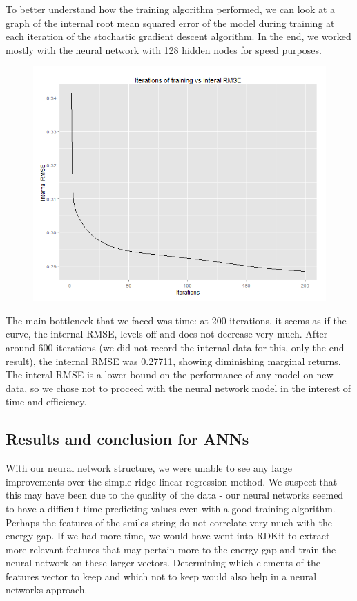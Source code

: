 \documentclass{article}
\begin{document}
To better understand how the training algorithm performed,
we can look at a graph of the internal root mean squared error
of the model during training at each iteration of the stochastic
gradient descent algorithm.  In the end, we worked mostly with
the neural network with 128 hidden nodes for speed purposes.

\begin{figure}
  \begin{center}
    \includegraphics[scale=0.4]{run128.png}
  \end{center}
\end{figure}

The main bottleneck that we faced was time: at 200 iterations, it seems
as if the curve, the internal RMSE, levels off and does not
decrease very much.  After around 600 iterations (we did not
record the internal data for this, only the end result),
the internal RMSE was 0.27711, showing diminishing marginal
returns.  The interal RMSE is a lower
bound on the performance of any model on new data, so we chose
not to proceed with the neural network model in the interest
of time and efficiency.

\subsection{Results and conclusion for ANNs}
With our neural network structure, we were unable to see any large 
improvements over the simple ridge linear regression method.  
We suspect
 that this may have been due to the quality of the data 
 - our neural networks seemed to 
 have a difficult time predicting values even with a good training
 algorithm.  Perhaps the features of the smiles string do not correlate
 very much with the energy gap.  If we had more time, we would have
 went into RDKit to extract more relevant features that may pertain more
 to the energy gap and train the neural network on these larger
 vectors.  Determining which elements of the features vector
 to keep and which not to keep would also help in a neural networks approach.
 
\end{document}

